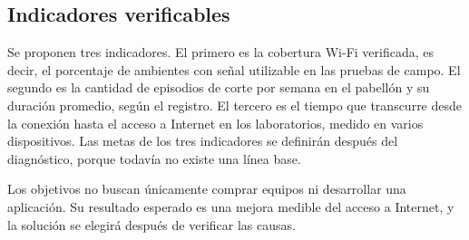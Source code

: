 \subsection{Indicadores verificables}

	Se proponen tres indicadores. El primero es la cobertura Wi-Fi verificada, es decir, el porcentaje de ambientes con señal utilizable en las pruebas de campo. El segundo es la cantidad de episodios de corte por semana en el pabellón y su duración promedio, según el registro. El tercero es el tiempo que transcurre desde la conexión hasta el acceso a Internet en los laboratorios, medido en varios dispositivos. Las metas de los tres indicadores se definirán después del diagnóstico, porque todavía no existe una línea base.

	Los objetivos no buscan únicamente comprar equipos ni desarrollar una aplicación. Su resultado esperado es una mejora medible del acceso a Internet, y la solución se elegirá después de verificar las causas.
